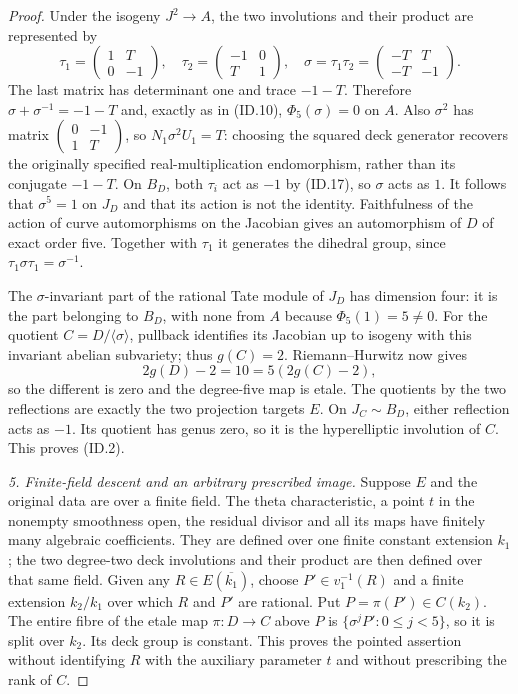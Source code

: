 \begin{proof}
Under the isogeny $J^2\to A$, the two involutions and their
product are represented by
\[
 \tau_1=\begin{pmatrix}1&T\\0&-1\end{pmatrix},\quad
 \tau_2=\begin{pmatrix}-1&0\\T&1\end{pmatrix},\quad
 \sigma=\tau_1\tau_2=
            \begin{pmatrix}-T&T\\-T&-1\end{pmatrix}.
 \tag{ID.19}
\]
The last matrix has determinant one and trace $-1-T$.
Therefore $\sigma+\sigma^{-1}=-1-T$ and, exactly as in
(ID.10), $\Phi_5(\sigma)=0$ on $A$.
Also $\sigma^2$ has matrix
$\left(\begin{smallmatrix}0&-1\\1&T\end{smallmatrix}\right)$,
so $N_1\sigma^2U_1=T$: choosing the squared deck generator
recovers the originally specified real-multiplication
endomorphism, rather than its conjugate $-1-T$.
On $B_D$, both $\tau_i$ act as $-1$ by (ID.17), so
$\sigma$ acts as $1$. It follows that $\sigma^5=1$ on
$J_D$ and that its action is not the identity. Faithfulness
of the action of curve automorphisms on the Jacobian gives
an automorphism of $D$ of exact order five. Together with
$\tau_1$ it generates the dihedral group, since
$\tau_1\sigma\tau_1=\sigma^{-1}$.

The $\sigma$-invariant part of the rational Tate module of
$J_D$ has dimension four: it is the part belonging to
$B_D$, with none from $A$ because $\Phi_5(1)=5\ne0$.
For the quotient $C=D/\langle\sigma\rangle$, pullback
identifies its Jacobian up to isogeny with this invariant
abelian subvariety; thus $g(C)=2$.
Riemann--Hurwitz now gives
\[
                 2g(D)-2=10=5(2g(C)-2),
 \tag{ID.20}
\]
so the different is zero and the degree-five map is etale.
The quotients by the two reflections are exactly the two
projection targets $E$. On $J_C\sim B_D$, either reflection
acts as $-1$. Its quotient has genus zero, so it is the
hyperelliptic involution of $C$. This proves (ID.2).

\emph{5. Finite-field descent and an arbitrary prescribed image.}
Suppose $E$ and the original data are over a finite field.
The theta characteristic, a point $t$ in the nonempty
smoothness open, the residual divisor and all its maps have
finitely many algebraic coefficients. They are defined over
one finite constant extension $k_1$; the two degree-two
deck involutions and their product are then defined over
that same field. Given any $R\in E(\overline{k_1})$, choose
$P'\in v_1^{-1}(R)$ and a finite extension $k_2/k_1$ over
which $R$ and $P'$ are rational. Put $P=\pi(P')\in C(k_2)$.
The entire fibre of the etale map $\pi:D\to C$ above $P$
is $\{\sigma^jP':0\le j<5\}$, so it is split over $k_2$.
Its deck group is constant. This proves the pointed
assertion without identifying $R$ with the auxiliary
parameter $t$ and without prescribing the rank of $C$.
\end{proof}

